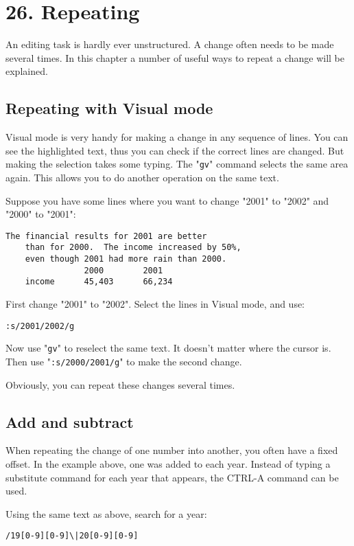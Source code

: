 \section{26. Repeating}
An editing task is hardly ever unstructured.
A change often needs to be made several times.
In this chapter a number of useful ways to repeat a change will be explained.
\subsection{Repeating with Visual mode}
Visual mode is very handy for making a change in any sequence of lines.
You can see the highlighted text, thus you can check if the correct lines are changed.
But making the selection takes some typing.
The "\verb!gv!" command selects the same area again.
This allows you to do another operation on the same text.

Suppose you have some lines where you want to change "2001" to "2002" and "2000" to "2001":

\begin{Verbatim}[samepage=true]
    The financial results for 2001 are better 
    than for 2000.  The income increased by 50%, 
    even though 2001 had more rain than 2000. 
                2000        2001 
    income      45,403      66,234 
\end{Verbatim}

First change "2001" to "2002".  Select the lines in Visual mode, and use:

\begin{Verbatim}[samepage=true]
 :s/2001/2002/g
\end{Verbatim}

Now use "\verb!gv!" to reselect the same text.
It doesn't matter where the cursor is.
Then use "\verb!:s/2000/2001/g!" to make the second change.

Obviously, you can repeat these changes several times.
\subsection{Add and subtract}
When repeating the change of one number into another, you often have a fixed offset.
In the example above, one was added to each year.
Instead of typing a substitute command for each year that appears, the CTRL-A command can be used.

Using the same text as above, search for a year:

\begin{Verbatim}[samepage=true]
 /19[0-9][0-9]\|20[0-9][0-9]
\end{Verbatim}

